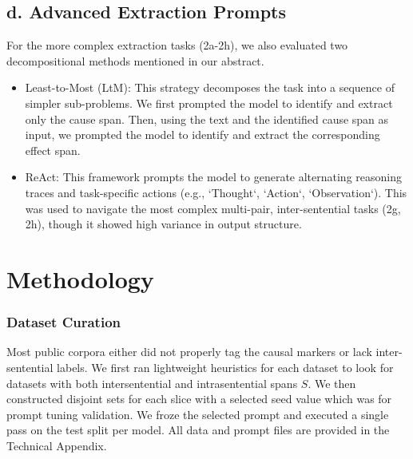 \documentclass[conference]{IEEEtran}
\begin{document}
\subsection*{d. Advanced Extraction Prompts}
For the more complex extraction tasks (2a-2h), we also evaluated two decompositional methods mentioned in our abstract.
\begin{itemize}[leftmargin=*]
    \item {Least-to-Most (LtM):} This strategy decomposes the task into a sequence of simpler sub-problems. We first prompted the model to identify and extract only the cause span. Then, using the text and the identified cause span as input, we prompted the model to identify and extract the corresponding effect span.
    \item {ReAct:} This framework prompts the model to generate alternating reasoning traces and task-specific actions (e.g., `Thought`, `Action`, `Observation`). This was used to navigate the most complex multi-pair, inter-sentential tasks (2g, 2h), though it showed high variance in output structure.
\end{itemize}

\section{Methodology}



\subsubsection{Dataset Curation}
Most public corpora either did not properly tag the causal markers or lack inter-sentential labels. We first ran lightweight heuristics for each dataset to look for datasets with both intersentential and intrasentential spans \(S\). We then constructed disjoint sets for each slice with a selected seed value which was for prompt tuning validation. We froze the selected prompt and executed a single pass on the test split per model. All data and prompt files are provided in the Technical Appendix.
\end{document}
